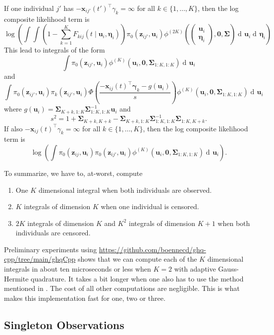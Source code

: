 \documentclass{article}
\newcommand\mat[1]{\mathbf{#1}}
\renewcommand\vec{\bm}
\newcommand\der{\operatorname{d\!}{}}
\begin{document}
If one individual $j'$ has  $-\vec x_{ij'}(t')^\top\gamma_k = \infty$ for all 
$k\in\{1,\dots,K\}$, then the log composite likelihood term is %
%
$$
\log\left(\int\int\left(1 - \sum_{k = 1}^K F_{kij}(t\mid \vec u_i, \vec\eta_i)\right)
  \pi_0(\vec z_{ij'}, \vec u_i)
   \phi^{(2K)}\left(
      \begin{pmatrix}
        \vec u_i \\ \vec\eta_i
      \end{pmatrix}, \vec 0,\mat \Sigma\right)
  \der \vec u_i\der \vec\eta_i\right) 
$$%
%
This lead to integrals of the form %
%
$$
\int \pi_0(\vec z_{ij'}, \vec u_i)\phi^{(K)}\left(
      \vec u_i, \vec 0,\mat \Sigma_{1:K,1:K}\right)
  \der \vec u_i 
$$ %
%
and%
%
$$
\int \pi_0(\vec z_{ij'}, \vec u_i)
     \pi_k(\vec z_{ij'}, \vec u_i)
	 \Phi\left(
       \frac{-\vec x_{ij}(t)^\top\vec\gamma_{k} - g(\vec u_i)}s
     \right)     
     \phi^{(K)}\left(
      \vec u_i, \vec 0,\mat \Sigma_{1:K,1:K}\right)
  \der \vec u_i 
$$%
% 
where $g(\vec u_i) = 
    \mat\Sigma_{K + k, 1:K}\mat\Sigma_{1:K, 1:K}^{-1}\vec u_i$ and%
%
$$
s^2 = 1 + \mat\Sigma_{K + k, K + k} 
  - \mat \Sigma_{K + k,1:K}\mat\Sigma_{1:K, 1:K}^{-1}\mat\Sigma_{1:K,K + k}.
$$%
%
If also  $-\vec x_{ij}(t)^\top\gamma_k = \infty$ for all $k\in\{1,\dots,K\}$, then 
the log composite likelihood term is%
%
$$
\log\left(\int
  \pi_0(\vec z_{ij}, \vec u_i)\pi_0(\vec z_{ij'}, \vec u_i)
   \phi^{(K)}\left(
      \vec u_i, \vec 0,\mat \Sigma_{1:K,1:K}\right)
  \der \vec u_i\right). 
$$

To summarize, we have to, at-worst, compute %
%
\begin{enumerate}
  \item One $K$ dimensional integral when both individuals are observed. 
  \item $K$ integrals of dimension $K$ when one individual is censored. 
  \item $2K$ integrals of dimension $K$ and $K^2$ integrals of dimension $K + 1$ when both individuals are censored. 
\end{enumerate}%
%
Preliminary experiments using 
\url{https://github.com/boennecd/ghq-cpp/tree/main/ghqCpp} shows that we 
can compute each of the $K$ dimensional integrals in about ten 
microseconds or less when $K = 2$ with adaptive Gauss-Hermite quadrature. 
It takes a bit longer when one also has to use the method mentioned 
in \cite{Genz04}. 
The cost of all other computations are negligible.
This is what makes this implementation fast for one, two or three.

\subsection{Singleton Observations}\label{subsec:singleton}
\end{document}
